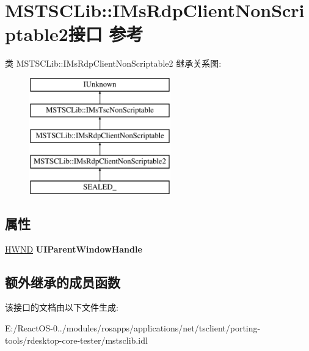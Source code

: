 \hypertarget{interface_m_s_t_s_c_lib_1_1_i_ms_rdp_client_non_scriptable2}{}\section{M\+S\+T\+S\+C\+Lib\+:\+:I\+Ms\+Rdp\+Client\+Non\+Scriptable2接口 参考}
\label{interface_m_s_t_s_c_lib_1_1_i_ms_rdp_client_non_scriptable2}
类 M\+S\+T\+S\+C\+Lib\+:\+:I\+Ms\+Rdp\+Client\+Non\+Scriptable2 继承关系图\+:\begin{figure}[H]
\begin{center}
\leavevmode
\includegraphics[height=5.000000cm]{interface_m_s_t_s_c_lib_1_1_i_ms_rdp_client_non_scriptable2}
\end{center}
\end{figure}
\subsection*{属性}
\begin{DoxyCompactItemize}
\item 
\mbox{\label{interface_m_s_t_s_c_lib_1_1_i_ms_rdp_client_non_scriptable2_a3bb1879e458201ac843415246d3037cc}} 
\hyperlink{interfacevoid}{H\+W\+ND} {\bfseries U\+I\+Parent\+Window\+Handle}
\end{DoxyCompactItemize}
\subsection*{额外继承的成员函数}


该接口的文档由以下文件生成\+:\begin{DoxyCompactItemize}
\item 
E\+:/\+React\+O\+S-\/0../modules/rosapps/applications/net/tsclient/porting-\/tools/rdesktop-\/core-\/tester/mstsclib.\+idl\end{DoxyCompactItemize}
